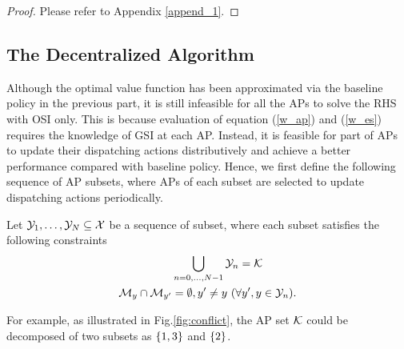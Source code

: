 \begin{proof}
    Please refer to Appendix \ref{append_1}.
\end{proof}

\subsection{The Decentralized Algorithm}
\label{subsec:ap_alg}
Although the optimal value function has been approximated via the baseline policy in the previous part, it is still infeasible for all the APs to solve the RHS with OSI only.
This is because evaluation of equation (\ref{w_ap}) and (\ref{w_es}) requires the knowledge of GSI at each AP.
Instead, it is feasible for part of APs to update their dispatching actions distributively and achieve a better performance compared with baseline policy.
Hence, we first define the following sequence of AP subsets, where APs of each subset are selected to update dispatching actions periodically.
\begin{definition}
    Let $\mathcal{Y}_{1}, \dots, \mathcal{Y}_{N} \subseteq \mathcal{X}$ be a sequence of subset, where each subset satisfies the following constraints
    \begin{align}
        &\bigcup_{n=0,\dots,N-1} \mathcal{Y}_{n} = \mathcal{K}
        \\
        \mathcal{M}_{y} \cap \mathcal{M}_{y'} &=\emptyset, y' \neq y~(\forall y',y \in \mathcal{Y}_{n}).
    \end{align}
\end{definition}
For example, as illustrated in Fig.\ref{fig:conflict}, the AP set $\mathcal{K}$ could be decomposed of two subsets as $\{1,3\}$ and $\{2\}$.

